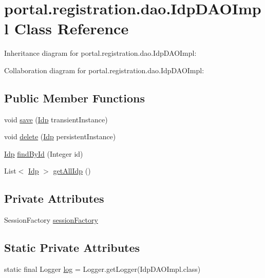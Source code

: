 \hypertarget{classportal_1_1registration_1_1dao_1_1IdpDAOImpl}{
\section{portal.registration.dao.IdpDAOImpl Class Reference}
\label{classportal_1_1registration_1_1dao_1_1IdpDAOImpl}
}


Inheritance diagram for portal.registration.dao.IdpDAOImpl:


Collaboration diagram for portal.registration.dao.IdpDAOImpl:
\subsection*{Public Member Functions}
\begin{DoxyCompactItemize}
\item 
void \hyperlink{classportal_1_1registration_1_1dao_1_1IdpDAOImpl_a531666f1be9ad29adcb5927b435ede02}{save} (\hyperlink{classportal_1_1registration_1_1domain_1_1Idp}{Idp} transientInstance)
\item 
void \hyperlink{classportal_1_1registration_1_1dao_1_1IdpDAOImpl_a63e3814d1126ab4ae9ce93e576515650}{delete} (\hyperlink{classportal_1_1registration_1_1domain_1_1Idp}{Idp} persistentInstance)
\item 
\hyperlink{classportal_1_1registration_1_1domain_1_1Idp}{Idp} \hyperlink{classportal_1_1registration_1_1dao_1_1IdpDAOImpl_a90d580cdc427c86e306d8a0a64999060}{findById} (Integer id)
\item 
List$<$ \hyperlink{classportal_1_1registration_1_1domain_1_1Idp}{Idp} $>$ \hyperlink{classportal_1_1registration_1_1dao_1_1IdpDAOImpl_a11d56e0832db6e91e8b55ee15931406b}{getAllIdp} ()
\end{DoxyCompactItemize}
\subsection*{Private Attributes}
\begin{DoxyCompactItemize}
\item 
SessionFactory \hyperlink{classportal_1_1registration_1_1dao_1_1IdpDAOImpl_a92e1382182c2bb2542cfbb22af8040dc}{sessionFactory}
\end{DoxyCompactItemize}
\subsection*{Static Private Attributes}
\begin{DoxyCompactItemize}
\item 
static final Logger \hyperlink{classportal_1_1registration_1_1dao_1_1IdpDAOImpl_a7afb61fce1c69227c0233f4f9109a59e}{log} = Logger.getLogger(IdpDAOImpl.class)
\end{DoxyCompactItemize}


